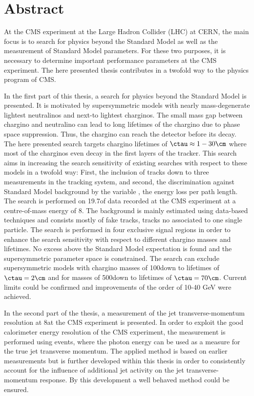\chapter*{Abstract}

At the CMS experiment at the Large Hadron Collider (LHC) at CERN, the main focus is to search for physics beyond the Standard Model as well as the measurement of Standard Model parameters.
For these two purposes, it is necessary to determine important performance parameters at the CMS experiment.
The here presented thesis contributes in a twofold way to the physics program of CMS.

In the first part of this thesis, a search for physics beyond the Standard Model is presented.
It is motivated by supersymmetric models with nearly mass-degenerate lightest neutralinos and next-to lightest charginos.
The small mass gap between chargino and neutralino can lead to long lifetimes of the chargino due to phase space suppression.
Thus, the chargino can reach the detector before its decay.
The here presented search targets chargino lifetimes of $\ctau \approx 1 - 30\cm $ where most of the charginos even decay in the first layers of the tracker. 
This search aims in increasing the search sensitivity of existing searches with respect to these models in a twofold way: First, the inclusion of tracks down to three measurements in the tracking system, and second, the discrimination against Standard Model background by the variable \dedx, the energy loss per path length.
The search is performed on 19.7\fbinv of data recorded at the CMS experiment at a centre-of-mass energy of 8\tev.
The background is mainly estimated using data-based techniques and consists mostly of fake tracks, \ie tracks no associated to one single particle.
The search is performed in four exclusive signal regions in order to enhance the search sensitivity with respect to different chargino masses and lifetimes.
No excess above the Standard Model expectation is found and the supersymmetric parameter space is constrained.
The search can exclude supersymmetric models with chargino masses of 100\gev down to lifetimes of $\ctau=2\cm$ and for masses of 500\gev down to lifetimes of $\ctau=70\cm$.
Current limits could be confirmed and improvements of the order of 10-40 GeV were achieved.

In the second part of the thesis, a measurement of the jet transverse-momentum resolution at 8\tev at the CMS experiment is presented.
In order to exploit the good calorimeter energy resolution of the CMS experiment, the measurement is performed using \GAMJET events, where the photon energy can be used as a measure for the true jet transverse momentum. 
The applied method is based on earlier measurements but is further developed within this thesis in order to consistently account for the influence of additional jet activity on the jet transverse-momentum response.
By this development a well behaved method could be ensured.

\cleardoublepage
